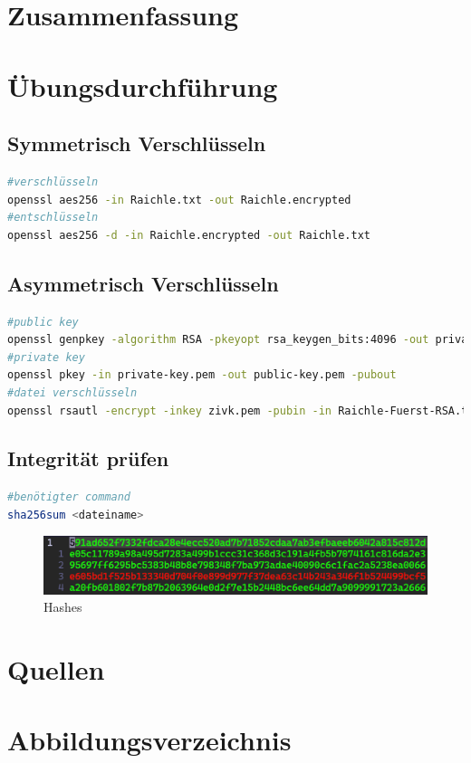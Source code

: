 \documentclass[a4paper]{article}
\begin{document}
\section{Zusammenfassung}


\newpage

\section{Übungsdurchführung}

\subsection{Symmetrisch Verschlüsseln}
\begin{lstlisting}[language=bash]
#verschlüsseln
openssl aes256 -in Raichle.txt -out Raichle.encrypted
#entschlüsseln
openssl aes256 -d -in Raichle.encrypted -out Raichle.txt
\end{lstlisting}

\subsection{Asymmetrisch Verschlüsseln}
\begin{lstlisting}[language=bash]
#public key
openssl genpkey -algorithm RSA -pkeyopt rsa_keygen_bits:4096 -out private-key.pem
#private key
openssl pkey -in private-key.pem -out public-key.pem -pubout
#datei verschlüsseln
openssl rsautl -encrypt -inkey zivk.pem -pubin -in Raichle-Fuerst-RSA.txt -out Raichle-Fuerst-RSA.txt.zivk.enc
\end{lstlisting}

\subsection{Integrität prüfen}
\begin{lstlisting}[language=bash]
#benötigter command
sha256sum <dateiname>
\end{lstlisting}

\begin{figure}[h]
	\includegraphics[scale=0.3]{images/hashes.png}
	\caption{Hashes}
\end{figure}



\newpage
\section{Quellen}

\newpage
\section{Abbildungsverzeichnis}

\listoffigures
\end{document}
